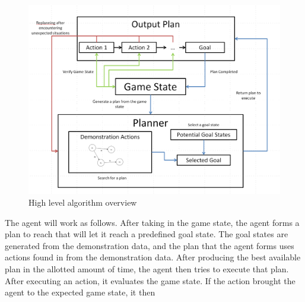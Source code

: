 \begin{figure}[h]
	\centering
	\includegraphics[width=\textwidth]{Figures/SearchFlowChart.png}
	\caption{High level algorithm overview}
	\label{transitions}
\end{figure}

The agent will work as follows. After taking in the game state, the agent forms a plan to reach that will let it reach a predefined goal state. The goal states are generated from the demonstration data, and the plan that the agent forms uses actions found in from the demonstration data. After producing the best available plan in the allotted amount of time, the agent then tries to execute that plan. After executing an action, it evaluates the game state. If the action brought the agent to the expected game state, it then 
